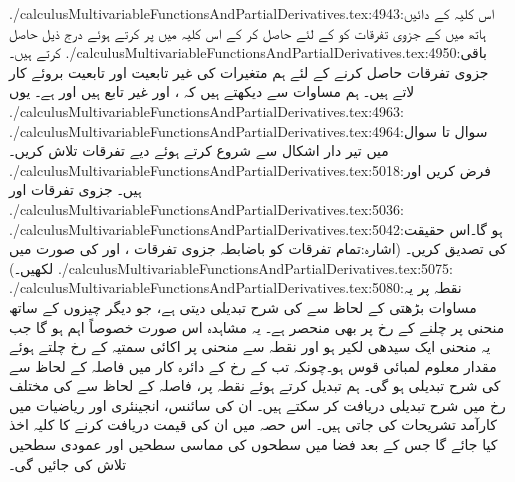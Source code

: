 ./calculusMultivariableFunctionsAndPartialDerivatives.tex:4943:اس کلیہ کے  دائیں ہاتھ میں  کے جزوی تفرقات کو   کے لئے حاصل کر کے  اس کلیہ میں پر کرتے ہوئے  درج ذیل حاصل کرتے ہیں۔
./calculusMultivariableFunctionsAndPartialDerivatives.tex:4950:باقی جزوی تفرقات حاصل کرنے کے لئے  ہم متغیرات کی غیر تابعیت اور تابعیت  بروئے کار لاتے ہیں۔ ہم مساوات  سے دیکھتے ہیں کہ ،  اور  غیر تابع  ہیں اور   ہے۔ یوں
./calculusMultivariableFunctionsAndPartialDerivatives.tex:4963:\\
./calculusMultivariableFunctionsAndPartialDerivatives.tex:4964:سوال  تا سوال  میں  تیر دار اشکال سے شروع کرتے ہوئے دیے تفرقات تلاش کریں۔
./calculusMultivariableFunctionsAndPartialDerivatives.tex:5018:فرض کریں  اور  ہیں۔ جزوی تفرقات   اور 
./calculusMultivariableFunctionsAndPartialDerivatives.tex:5036:\\
./calculusMultivariableFunctionsAndPartialDerivatives.tex:5042:ہو گا۔اس حقیقت  کی تصدیق کریں۔ (اشارہ:تمام تفرقات کو باضابطہ جزوی تفرقات ،   اور  کی صورت میں لکھیں۔)
./calculusMultivariableFunctionsAndPartialDerivatives.tex:5075:
./calculusMultivariableFunctionsAndPartialDerivatives.tex:5080:نقطہ   پر یہ مساوات بڑھتی  کے لحاظ سے  کی شرح تبدیلی دیتی ہے،  جو دیگر  چیزوں کے ساتھ  منحنی پر چلنے کے رخ پر بھی منحصر ہے۔ یہ  مشاہدہ   اس صورت خصوصاً     اہم  ہو  گا  جب یہ    منحنی ایک سیدھی  لکیر ہو  اور نقطہ   سے منحنی پر اکائی سمتیہ  کے رخ  چلتے ہوئے  مقدار معلوم لمبائی قوس     ہو۔چونکہ تب   کے رخ  کے دائرہ کار میں  فاصلہ کے لحاظ  سے    کی شرح تبدیلی   ہو گی۔ ہم      تبدیل کرتے ہوئے نقطہ  پر،     فاصلہ کے لحاظ سے  کی مختلف رخ میں  شرح تبدیلی    دریافت کر سکتے ہیں۔   ان   کی  سائنس،  انجینئری اور ریاضیات   میں کارآمد  تشریحات  کی جاتی ہیں۔ اس حصہ میں ان کی قیمت دریافت کرنے کا کلیہ اخذ کیا جائے گا جس کے بعد فضا میں سطحوں کی مماسی سطحیں اور عمودی سطحیں تلاش کی جائیں گی۔
